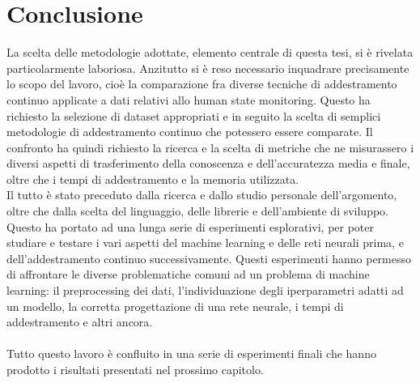 \section{Conclusione}
La scelta delle metodologie adottate, elemento centrale di questa tesi, si è rivelata particolarmente laboriosa. Anzitutto si è reso necessario inquadrare precisamente lo scopo del lavoro, cioè la comparazione fra diverse tecniche di addestramento continuo applicate a dati relativi allo human state monitoring. Questo ha richiesto la selezione di dataset appropriati e in seguito la scelta di semplici metodologie di addestramento continuo che potessero essere comparate. Il confronto ha quindi richiesto la ricerca e la scelta di metriche che ne misurassero i diversi aspetti di trasferimento della conoscenza e dell'accuratezza media e finale, oltre che i tempi di addestramento e la memoria utilizzata.\\
Il tutto è stato preceduto dalla ricerca e dallo studio personale dell'argomento, oltre che dalla scelta del linguaggio, delle librerie e dell'ambiente di sviluppo. Questo ha portato ad una lunga serie di esperimenti esplorativi, per poter studiare e testare i vari aspetti del machine learning e delle reti neurali prima, e dell'addestramento continuo successivamente. Questi esperimenti hanno permesso di affrontare le diverse problematiche comuni ad un problema di machine learning: il preprocessing dei dati, l'individuazione degli iperparametri adatti ad un modello, la corretta progettazione di una rete neurale, i tempi di addestramento e altri ancora.\\\\
Tutto questo lavoro è confluito in una serie di esperimenti finali che hanno prodotto i risultati presentati nel prossimo capitolo.


